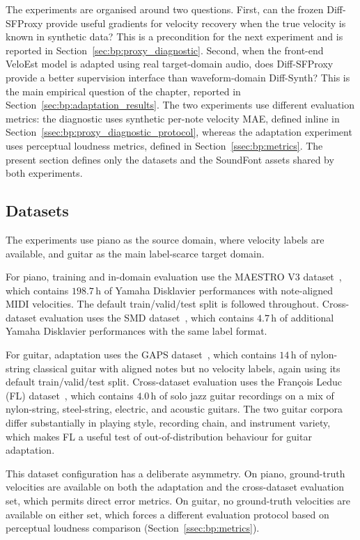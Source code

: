 The experiments are organised around two questions. First, can the frozen Diff-SFProxy provide useful gradients for velocity recovery when the true velocity is known in synthetic data? This is a precondition for the next experiment and is reported in Section~\ref{sec:bp:proxy_diagnostic}. Second, when the front-end VeloEst model is adapted using real target-domain audio, does Diff-SFProxy provide a better supervision interface than waveform-domain Diff-Synth? This is the main empirical question of the chapter, reported in Section~\ref{sec:bp:adaptation_results}. The two experiments use different evaluation metrics: the diagnostic uses synthetic per-note velocity MAE, defined inline in Section~\ref{ssec:bp:proxy_diagnostic_protocol}, whereas the adaptation experiment uses perceptual loudness metrics, defined in Section~\ref{ssec:bp:metrics}. The present section defines only the datasets and the SoundFont assets shared by both experiments.

\subsection{Datasets}
\label{ssec:bp:datasets}

The experiments use piano as the source domain, where velocity labels are available, and guitar as the main label-scarce target domain.

For piano, training and in-domain evaluation use the MAESTRO V3 dataset~\cite{hawthorne2019maestro}, which contains $198.7$\,h of Yamaha Disklavier performances with note-aligned MIDI velocities. The default train/valid/test split is followed throughout. Cross-dataset evaluation uses the SMD dataset~\cite{smd}, which contains $4.7$\,h of additional Yamaha Disklavier performances with the same label format.

For guitar, adaptation uses the GAPS dataset~\cite{riley2024gaps}, which contains $14$\,h of nylon-string classical guitar with aligned notes but no velocity labels, again using its default train/valid/test split. Cross-dataset evaluation uses the Fran\c{c}ois Leduc (FL) dataset~\cite{riley2024high}, which contains $4.0$\,h of solo jazz guitar recordings on a mix of nylon-string, steel-string, electric, and acoustic guitars. The two guitar corpora differ substantially in playing style, recording chain, and instrument variety, which makes FL a useful test of out-of-distribution behaviour for guitar adaptation.

This dataset configuration has a deliberate asymmetry. On piano, ground-truth velocities are available on both the adaptation and the cross-dataset evaluation set, which permits direct error metrics. On guitar, no ground-truth velocities are available on either set, which forces a different evaluation protocol based on perceptual loudness comparison (Section~\ref{ssec:bp:metrics}).

